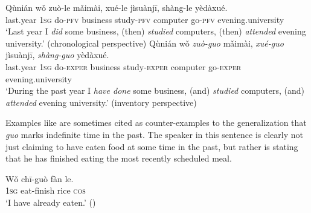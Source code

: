 \ea \label{ex:22.33}

\ea \gll  Qùnián  wǒ  {zuò-le}  mǎimài,  {xué-le}  jìsuànjī,  {shàng-le}  yèdàxué.\\
last.year  \textsc{1sg}  do-\textsc{pfv}  business  study-\textsc{pfv}  computer  go-\textsc{pfv}  evening.university\\
\glt ‘Last year I \textit{did} some business, (then) \textit{studied} computers, (then) \textit{attended} evening university.’ (chronological perspective)
\ex \gll  Qùnián  wǒ  \textit{zuò-guo}  mǎimài,  \textit{xué-guo}  jìsuànjī,  \textit{shàng-guo}  yèdàxué.\\
last.year  \textsc{1sg}  do-\textsc{exper}  business  study-\textsc{exper}  computer  go-\textsc{exper}  evening.university\\
\glt ‘During the past year I \textit{have done} some business, (and) \textit{studied} computers, (and) \textit{attended} evening university.’ (inventory perspective)
\z \z


Examples like  are sometimes cited as counter-examples to the generalization that \textit{guo} marks indefinite time in the past. The speaker in this sentence is clearly not just claiming to have eaten food at some time in the past, but rather is stating that he has finished eating the most recently scheduled meal.


\ea \label{ex:22.34}
\gll Wǒ  chī-guò  fàn  le.\\
\textsc{1sg}  eat-finish  rice  \textsc{cos}{\footnotemark}\\
\glt ‘I have already eaten.’  (\citealt{Ma1977})
\z
{}

